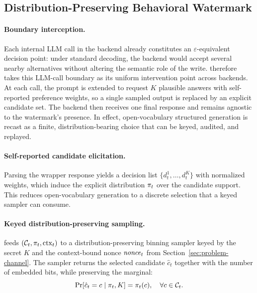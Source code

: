 \subsection{Distribution-Preserving Behavioral Watermark}
\label{sec:method-sampler}

\paragraph{Boundary interception.}
Each internal LLM call in the backend already constitutes an
$\varepsilon$-equivalent decision point: under standard decoding, the
backend would accept several nearby alternatives without altering the
semantic role of the write. \memmark{} therefore takes this LLM-call
boundary as its uniform intervention point across backends. At each call,
the prompt is extended to request $K$ plausible answers with self-reported
preference weights, so a single sampled output is replaced by an explicit
candidate set. The backend then receives one final response and remains
agnostic to the watermark's presence. In effect, open-vocabulary
structured generation is recast as a finite, distribution-bearing choice
that can be keyed, audited, and replayed.

\paragraph{Self-reported candidate elicitation.}
Parsing the wrapper response yields a decision list
$\{d_t^1,\ldots,d_t^K\}$ with normalized weights, which induce the
explicit distribution $\pi_t$ over the candidate support. This
reduces open-vocabulary generation to a discrete selection that a keyed
sampler can consume. 

\paragraph{Keyed distribution-preserving sampling.}
\memmark{} feeds $(\mathcal{C}_t,\pi_t,\mathrm{ctx}_t)$ to a
distribution-preserving binning sampler keyed by the secret $K$ and the
context-bound nonce $\mathit{nonce}_t$ from Section~\ref{sec:problem-channel}. The
sampler returns the selected candidate $\hat c_t$ together with the
number of embedded bits, while preserving the marginal:
\begin{equation}
\Pr[\hat c_t=c\mid \pi_t,K]=\pi_t(c),\quad \forall c\in\mathcal{C}_t.
\end{equation}


